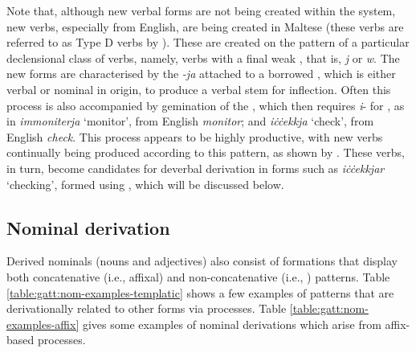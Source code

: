 \documentclass[output=paper]{LSP/langsci}
\begin{document}
Note that, although new verbal forms are not being created within the  system, new verbs, especially from English, are being created in Maltese (these verbs are referred to as Type D verbs by \citealt{Mifsud1995:Loan}). These are created on the pattern of a particular declensional class of verbs, namely, verbs with a final weak , that is, \textit{j} or \textit{w}. The new forms are characterised by the  \textit{-ja} attached to a borrowed , which is either verbal or nominal in origin, to produce a verbal stem for inflection. Often this process is also accompanied by gemination of the , which then requires \textit{i}- for , as in \textit{immoniterja} `monitor', from English \textit{monitor}; and \textit{iċċekkja} `check', from English \textit{check}. This process appears to be highly productive, with new verbs continually being produced according to this pattern, as shown by \citet{Mifsud1995:Loan}. These verbs, in turn, become candidates for deverbal derivation in forms such as \textit{iċċekkjar} `checking', formed using \ar, which will be discussed below.

\subsection{Nominal derivation}\label{sec:nominal}
Derived nominals (nouns and adjectives) also consist of formations that display both concatenative (i.e., affixal) and non-concatenative (i.e., ) patterns. Table \ref{table:gatt:nom-examples-templatic} shows a few examples of  patterns that are derivationally related to other forms via  processes. Table \ref{table:gatt:nom-examples-affix} gives some examples of nominal derivations which arise from affix-based processes.
\end{document}
